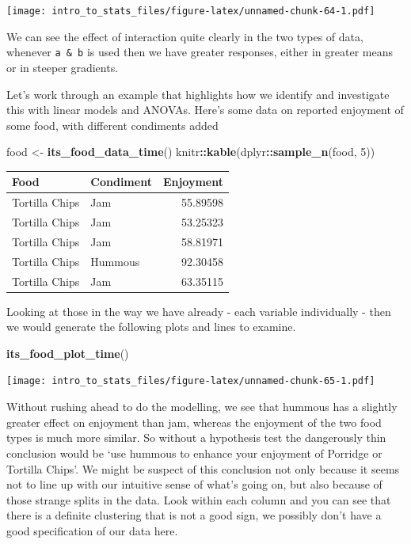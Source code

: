 \documentclass[
]{book}
\newenvironment{Shaded}{\begin{snugshade}}{\end{snugshade}}
\newcommand{\DecValTok}[1]{\textcolor[rgb]{0.00,0.00,0.81}{#1}}
\newcommand{\KeywordTok}[1]{\textcolor[rgb]{0.13,0.29,0.53}{\textbf{#1}}}
\newcommand{\NormalTok}[1]{#1}
\newcommand{\OperatorTok}[1]{\textcolor[rgb]{0.81,0.36,0.00}{\textbf{#1}}}
\newcommand{\StringTok}[1]{\textcolor[rgb]{0.31,0.60,0.02}{#1}}
\begin{document}
\texttt{[image: intro\_to\_stats\_files/figure-latex/unnamed-chunk-64-1.pdf]}

We can see the effect of interaction quite clearly in the two types of data, whenever \texttt{a\ \&\ b} is used then we have greater responses, either in greater means or in steeper gradients.

Let's work through an example that highlights how we identify and investigate this with linear models and ANOVAs. Here's some data on reported enjoyment of some food, with different condiments added

\begin{Shaded}
\begin{Highlighting}[]
\NormalTok{food <-}\StringTok{ }\KeywordTok{its_food_data_time}\NormalTok{()}
\NormalTok{knitr}\OperatorTok{::}\KeywordTok{kable}\NormalTok{(dplyr}\OperatorTok{::}\KeywordTok{sample_n}\NormalTok{(food, }\DecValTok{5}\NormalTok{))                                             }
\end{Highlighting}
\end{Shaded}

\begin{tabular}{l|l|r}
\hline
Food & Condiment & Enjoyment\\
\hline
Tortilla Chips & Jam & 55.89598\\
\hline
Tortilla Chips & Jam & 53.25323\\
\hline
Tortilla Chips & Jam & 58.81971\\
\hline
Tortilla Chips & Hummous & 92.30458\\
\hline
Tortilla Chips & Jam & 63.35115\\
\hline
\end{tabular}

Looking at those in the way we have already - each variable individually - then we would generate the following plots and lines to examine.

\begin{Shaded}
\begin{Highlighting}[]
\KeywordTok{its_food_plot_time}\NormalTok{()}
\end{Highlighting}
\end{Shaded}

\texttt{[image: intro\_to\_stats\_files/figure-latex/unnamed-chunk-65-1.pdf]}

Without rushing ahead to do the modelling, we see that hummous has a slightly greater effect on enjoyment than jam, whereas the enjoyment of the two food types is much more similar. So without a hypothesis test the dangerously thin conclusion would be `use hummous to enhance your enjoyment of Porridge or Tortilla Chips'. We might be suspect of this conclusion not only because it seems not to line up with our intuitive sense of what's going on, but also because of those strange splits in the data. Look within each column and you can see that there is a definite clustering that is not a good sign, we possibly don't have a good specification of our data here.
\end{document}

